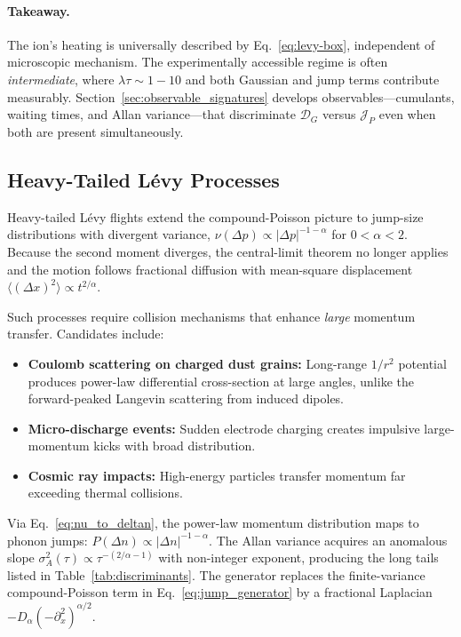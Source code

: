 \paragraph{Takeaway.}
The ion's heating is universally described by Eq.~\eqref{eq:levy-box}, independent of microscopic mechanism.
The experimentally accessible regime is often \emph{intermediate}, where $\lambda \tau \sim 1{-}10$ and both Gaussian and jump terms contribute measurably.
Section~\ref{sec:observable_signatures} develops observables—cumulants, waiting times, and Allan variance—that discriminate $\mathcal{D}_G$ versus $\mathcal{J}_P$ even when both are present simultaneously.

\subsection{Heavy-Tailed Lévy Processes}

Heavy-tailed Lévy flights extend the compound-Poisson picture to jump-size distributions with divergent variance, $\nu(\Delta p) \propto |\Delta p|^{-1-\alpha}$ for $0 < \alpha < 2$. Because the second moment diverges, the central-limit theorem no longer applies and the motion follows fractional diffusion with mean-square displacement $\langle(\Delta x)^2\rangle \propto t^{2/\alpha}$. 

Such processes require collision mechanisms that enhance \emph{large} momentum transfer. Candidates include:
\begin{itemize}[nosep,leftmargin=*]
\item \textbf{Coulomb scattering on charged dust grains:} Long-range $1/r^2$ potential produces power-law differential cross-section at large angles, unlike the forward-peaked Langevin scattering from induced dipoles.
\item \textbf{Micro-discharge events:} Sudden electrode charging creates impulsive large-momentum kicks with broad distribution.
\item \textbf{Cosmic ray impacts:} High-energy particles transfer momentum far exceeding thermal collisions.
\end{itemize}

Via Eq.~\eqref{eq:nu_to_deltan}, the power-law momentum distribution maps to phonon jumps: $P(\Delta n) \propto |\Delta n|^{-1-\alpha}$. The Allan variance acquires an anomalous slope $\sigma^2_A(\tau) \propto \tau^{-(2/\alpha-1)}$ with non-integer exponent, producing the long tails listed in Table~\ref{tab:discriminants}. The generator replaces the finite-variance compound-Poisson term in Eq.~\eqref{eq:jump_generator} by a fractional Laplacian $-D_\alpha(-\partial_x^2)^{\alpha/2}$.

